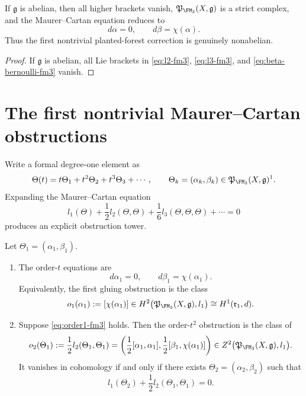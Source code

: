 \begin{corollary}
\label{cor:fm3-abelian-reduction}
If $\mathfrak g$ is abelian, then all higher brackets vanish,
$\mathfrak P_{\FM_3}(X,\mathfrak g)$ is a strict complex,
and the Maurer--Cartan equation reduces to
\[
 d\alpha = 0,
 \qquad
 d\beta = \chi(\alpha).
\]
Thus the first nontrivial planted-forest correction is genuinely nonabelian.
\end{corollary}

\begin{proof}
If $\mathfrak g$ is abelian, all Lie brackets in
\eqref{eq:l2-fm3}, \eqref{eq:l3-fm3}, and
\eqref{eq:beta-bernoulli-fm3} vanish.
\end{proof}

\section{The first nontrivial Maurer--Cartan obstructions}
\label{sec:fm3-obstructions}

Write a formal degree-one element as
\[
\Theta(t)=t\Theta_1+t^2\Theta_2+t^3\Theta_3+\cdots,
\qquad
\Theta_k=(\alpha_k,\beta_k)\in \mathfrak P_{\FM_3}(X,\mathfrak g)^1.
\]
Expanding the Maurer--Cartan equation
\[
 l_1(\Theta) + \frac12 l_2(\Theta,\Theta) + \frac16 l_3(\Theta,\Theta,\Theta) + \cdots = 0
\]
produces an explicit obstruction tower.

\begin{proposition}
\label{prop:fm3-first-obstructions}
Let $\Theta_1=(\alpha_1,\beta_1)$.
\begin{enumerate}[label=\textup{(\alph*)}]
\item The order-$t$ equations are
  \begin{equation}
  \label{eq:order1-fm3}
  d\alpha_1=0,
  \qquad
  d\beta_1 = \chi(\alpha_1).
  \end{equation}
  Equivalently, the first gluing obstruction is the class
  \begin{equation}
  \label{eq:first-gluing-obstruction}
  o_1(\alpha_1)
  :=
  [\chi(\alpha_1)]
  \in
  H^2\bigl(\mathfrak P_{\FM_3}(X,\mathfrak g),l_1\bigr)
  \cong
  H^1(\mathfrak r_1,d).
  \end{equation}
\item Suppose \eqref{eq:order1-fm3} holds.  Then the order-$t^2$ obstruction is
  the class of
  \begin{equation}
  \label{eq:o2-fm3}
  o_2(\Theta_1)
  :=
  \frac12 l_2(\Theta_1,\Theta_1)
  =
  \left(
  \frac12[\alpha_1,\alpha_1],
  \frac12[\beta_1,\chi(\alpha_1)]
  \right)
  \in
  Z^2\bigl(\mathfrak P_{\FM_3}(X,\mathfrak g),l_1\bigr).
  \end{equation}
  It vanishes in cohomology if and only if there exists
  $\Theta_2=(\alpha_2,\beta_2)$ such that
  \[
  l_1(\Theta_2) + \frac12 l_2(\Theta_1,\Theta_1) = 0.
  \]
\end{enumerate}
\end{proposition}

